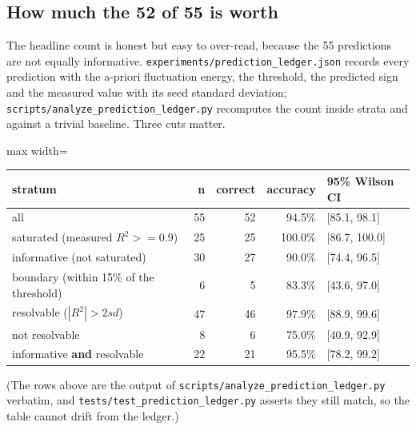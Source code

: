 \documentclass[preprint,12pt]{elsarticle}
\begin{document}
\subsection{How much the 52 of 55 is worth}

The headline count is honest but easy to over-read, because the 55 predictions are not equally informative. \texttt{experiments/prediction\_ledger.json} records every prediction with the a-priori fluctuation energy, the threshold, the predicted sign and the measured value with its seed standard deviation; \texttt{scripts/analyze\_prediction\_ledger.py} recomputes the count inside strata and against a trivial baseline. Three cuts matter.

\begin{center}
\begin{adjustbox}{max width=\linewidth}
\small
\begin{tabular}{lrrrl}
\toprule
stratum & n & correct & accuracy & 95\% Wilson CI \\
\midrule
all & 55 & 52 & 94.5\% & [85.1, 98.1] \\
saturated (measured $R^2 >= 0.9$) & 25 & 25 & 100.0\% & [86.7, 100.0] \\
informative (not saturated) & 30 & 27 & 90.0\% & [74.4, 96.5] \\
boundary (within 15\% of the threshold) & 6 & 5 & 83.3\% & [43.6, 97.0] \\
resolvable ($|R^2| > 2 sd$) & 47 & 46 & 97.9\% & [88.9, 99.6] \\
not resolvable & 8 & 6 & 75.0\% & [40.9, 92.9] \\
informative \textbf{and} resolvable & 22 & 21 & 95.5\% & [78.2, 99.2] \\
\bottomrule
\end{tabular}
\end{adjustbox}
\end{center}


(The rows above are the output of \texttt{scripts/analyze\_prediction\_ledger.py} verbatim, and \texttt{tests/test\_prediction\_ledger.py} asserts they still match, so the table cannot drift from the ledger.)
\end{document}
